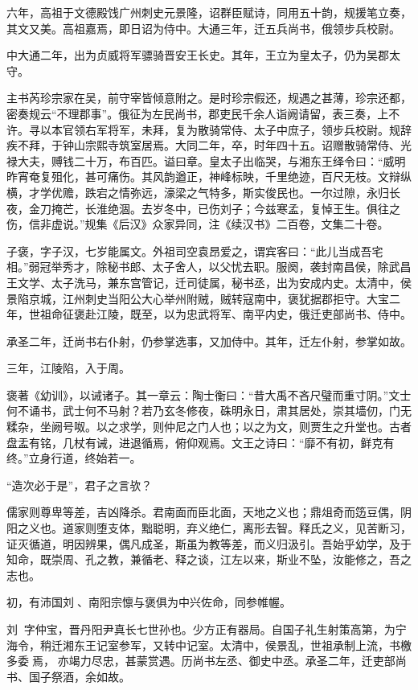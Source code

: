 \documentclass[12pt,UTF8]{ctexbook}
\begin{document}
六年，高祖于文德殿饯广州刺史元景隆，诏群臣赋诗，同用五十韵，规援笔立奏，其文又美。高祖嘉焉，即日诏为侍中。大通三年，迁五兵尚书，俄领步兵校尉。

中大通二年，出为贞威将军骠骑晋安王长史。其年，王立为皇太子，仍为吴郡太守。

主书芮珍宗家在吴，前守宰皆倾意附之。是时珍宗假还，规遇之甚薄，珍宗还都，密奏规云“不理郡事”。俄征为左民尚书，郡吏民千余人诣阙请留，表三奏，上不许。寻以本官领右军将军，未拜，复为散骑常侍、太子中庶子，领步兵校尉。规辞疾不拜，于钟山宗熙寺筑室居焉。大同二年，卒，时年四十五。诏赠散骑常侍、光禄大夫，赙钱二十万，布百匹。谥曰章。皇太子出临哭，与湘东王绎令曰：“威明昨宵奄复殂化，甚可痛伤。其风韵遒正，神峰标映，千里绝迹，百尺无枝。文辩纵横，才学优赡，跌宕之情弥远，濠梁之气特多，斯实俊民也。一尔过隙，永归长夜，金刀掩芒，长淮绝涸。去岁冬中，已伤刘子；今兹寒孟，复悼王生。俱往之伤，信非虚说。”规集《后汉》众家异同，注《续汉书》二百卷，文集二十卷。

子褒，字子汉，七岁能属文。外祖司空袁昂爱之，谓宾客曰：“此儿当成吾宅相。”弱冠举秀才，除秘书郎、太子舍人，以父忧去职。服阕，袭封南昌侯，除武昌王文学、太子洗马，兼东宫管记，迁司徒属，秘书丞，出为安成内史。太清中，侯景陷京城，江州刺史当阳公大心举州附贼，贼转寇南中，褒犹据郡拒守。大宝二年，世祖命征褒赴江陵，既至，以为忠武将军、南平内史，俄迁吏部尚书、侍中。

承圣二年，迁尚书右仆射，仍参掌选事，又加侍中。其年，迁左仆射，参掌如故。

三年，江陵陷，入于周。

褒著《幼训》，以诫诸子。其一章云：陶士衡曰：“昔大禹不吝尺璧而重寸阴。”文士何不诵书，武士何不马射？若乃玄冬修夜，硃明永日，肃其居处，崇其墙仞，门无糅杂，坐阙号呶。以之求学，则仲尼之门人也；以之为文，则贾生之升堂也。古者盘盂有铭，几杖有诫，进退循焉，俯仰观焉。文王之诗曰：“靡不有初，鲜克有终。”立身行道，终始若一。

“造次必于是”，君子之言欤？

儒家则尊卑等差，吉凶降杀。君南面而臣北面，天地之义也；鼎俎奇而笾豆偶，阴阳之义也。道家则堕支体，黜聪明，弃义绝仁，离形去智。释氏之义，见苦断习，证灭循道，明因辨果，偶凡成圣，斯虽为教等差，而义归汲引。吾始乎幼学，及于知命，既崇周、孔之教，兼循老、释之谈，江左以来，斯业不坠，汝能修之，吾之志也。

初，有沛国刘、南阳宗懔与褒俱为中兴佐命，同参帷幄。

刘，字仲宝，晋丹阳尹真长七世孙也。少方正有器局。自国子礼生射策高第，为宁海令，稍迁湘东王记室参军，又转中记室。太清中，侯景乱，世祖承制上流，书檄多委焉，亦竭力尽忠，甚蒙赏遇。历尚书左丞、御史中丞。承圣二年，迁吏部尚书、国子祭酒，余如故。
\end{document}
